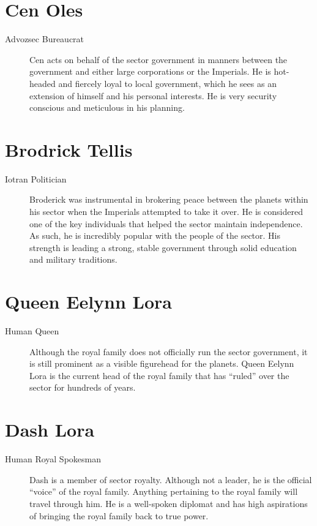 \documentclass{article}
\begin{document}
\section{Cen Oles}
\begin{description}
	\item [Advozsec \male Bureaucrat] Cen acts on behalf of the sector government in manners between the government and either large corporations or the Imperials. He is hot-headed and fiercely loyal to local government, which he sees as an extension of himself and his personal interests. He is very security conscious and meticulous in his planning.
\end{description}
\section{Brodrick Tellis}
\begin{description}
	\item [Iotran \male Politician] Broderick was instrumental in brokering peace between the planets within his sector when the Imperials attempted to take it over. He is considered one of the key individuals that helped the sector maintain independence. As such, he is incredibly popular with the people of the sector. His strength is leading a strong, stable government through solid education and military traditions.
\end{description}
\section{Queen Eelynn Lora}
\begin{description}
	\item [Human \female Queen] Although the royal family does not officially run the sector government, it is still prominent as a visible figurehead for the planets. Queen Eelynn Lora is the current head of the royal family that has “ruled” over the sector for hundreds of years.
\end{description}
\section{Dash Lora}
\begin{description}
	\item [Human \male Royal Spokesman] Dash is a member of sector royalty. Although not a leader, he is the official “voice” of the royal family. Anything pertaining to the royal family will travel through him. He is a well-spoken diplomat and has high aspirations of bringing the royal family back to true power.
\end{description}
\end{document}
